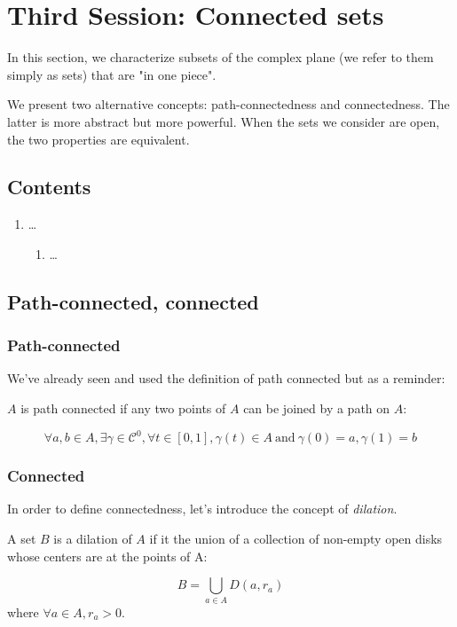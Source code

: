 \section{Third Session: Connected sets}
In this section, we characterize subsets of the complex plane (we refer to them simply as sets) that are "in one piece".

We present two alternative concepts: path-connectedness and connectedness. The latter is more abstract but more powerful. When the sets we consider are open, the two properties are equivalent.

\subsection*{Contents}
\begin{enumerate}
    \item \dots
        \begin{enumerate}
            \item \dots
        \end{enumerate}
\end{enumerate}

\subsection{Path-connected, connected}

\subsubsection{Path-connected}
We've already seen and used the definition of path connected but as a reminder:
\begin{defi}
   $A$ is path connected if any two points of $A$ can be joined by a path on $A$:

   $$\forall a,b\in A, \exists \gamma\in\mathcal{C}^0, \forall t\in[0,1], \gamma(t)\in A~\mathrm{ and}~\gamma(0) = a, \gamma(1) = b$$
\end{defi}

\subsubsection{Connected}
In order to define connectedness, let's introduce the concept of \emph{dilation}.

\begin{defi}[Dilation]
    A set $B$ is a dilation of $A$ if it the union of a collection of non-empty open disks whose centers are at the points of A:

    $$ B = \bigcup_{a\in A}{D(a, r_a)} $$
    where $\forall a\in A, r_a > 0$.
\end{defi}

